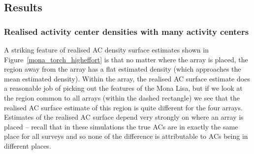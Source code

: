 \documentclass[useAMS,usenatbib,referee]{biom}
\begin{document}
\subsection{Results}

\subsubsection{Realised activity center densities with many activity centers}


A striking feature of realised AC density surface estimates shown in Figure~\ref{mona_torch_higheffort} is that no matter where the array is placed, the region away from the array has a flat estimated density (which approaches the mean estimated density). Within the array, the realised AC surface estimate does a reasonable job of picking out the features of the Mona Lisa, but if we look at the region common to all arrays (within the dashed rectangle) we see that the realised AC surface estimate of this region is quite different for the four arrays. Estimates of the realised AC surface depend very strongly on where an array is placed -- recall that in these simulations the true ACs are in exactly the same place for all surveys and so none of the difference is attributable to ACs being in different places.

\end{document}
